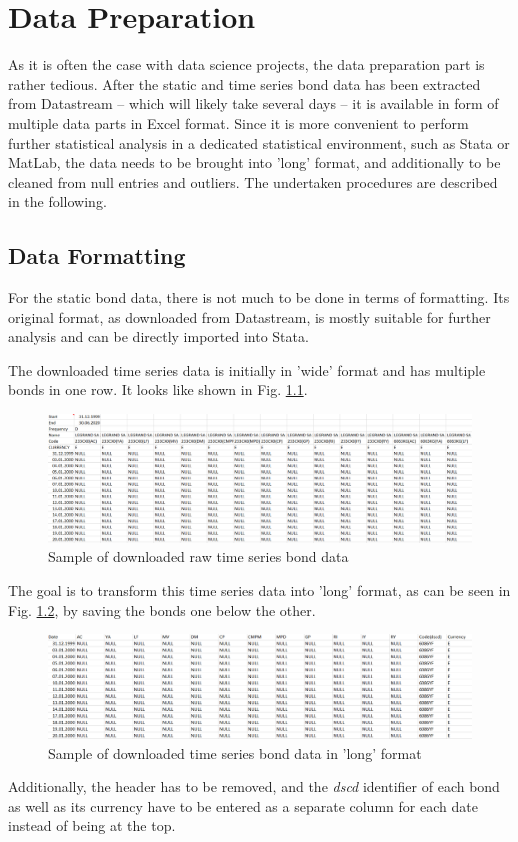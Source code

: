 \chapter{Data Preparation}  \label{chapter:data-preparation}
As it is often the case with data science projects, the data preparation part is rather tedious. After the static and time series bond data has been extracted from Datastream -- which will likely take several days -- it is available in form of multiple data parts in Excel format. Since it is more convenient to perform further statistical analysis in a dedicated statistical environment, such as Stata or MatLab, the data needs to be brought into 'long' format, and additionally to be cleaned from null entries and outliers. The undertaken procedures are described in the following. 

\section{Data Formatting}  \label{section:data-formatting}
For the static bond data, there is not much to be done in terms of formatting. Its original format, as downloaded from Datastream, is mostly suitable for further analysis and can be directly imported into Stata. 

The downloaded time series data is initially in 'wide' format and has multiple bonds in one row. It looks like shown in Fig. \ref{fig:original-excel-ts-data}. 

\begin{figure}[h]
	\centering
	\includegraphics[width=1.0\linewidth]{figures/original-excel-ts-data}
	\caption{Sample of downloaded raw time series bond data}
	\label{fig:original-excel-ts-data}
\end{figure}

The goal is to transform this time series data into 'long' format, as can be seen in Fig. \ref{fig:long-format-excel-ts-data}, by saving the bonds one below the other. 
\begin{figure}[h]
	\centering
	\includegraphics[width=1.0\linewidth]{figures/long-format-excel-ts-data}
	\caption{Sample of downloaded time series bond data in 'long' format}
	\label{fig:long-format-excel-ts-data}
\end{figure}
Additionally, the header has to be removed, and the \textit{dscd} identifier of each bond as well as its currency have to be entered as a separate column for each date instead of being at the top. 

